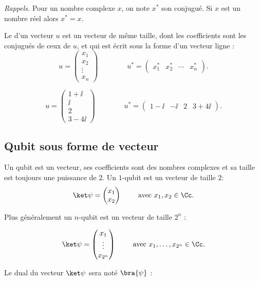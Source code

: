 \documentclass[11pt,class=report,crop=false]{standalone}
\begin{document}
\emph{Rappels.} 
Pour un nombre complexe $x$, on note $x^*$ son conjugué. Si $x$ est un nombre réel alors $x^* = x$.

Le  d'un vecteur $u$ est un vecteur de même taille, dont les coefficients sont les conjugués de ceux de $u$, et qui est écrit sous la forme d'un vecteur ligne :
$$u = \begin{pmatrix}x_1\\x_2\\\vdots\\x_n\end{pmatrix}
\qquad\qquad
u^* = \begin{pmatrix}x_1^*& x_2^*& \cdots &x_n^*\end{pmatrix}.$$


\begin{exemple}
$$u = \begin{pmatrix}1+\ii\\\ii\\2\\3-4\ii\end{pmatrix}
\qquad\qquad
u^* = \begin{pmatrix}1-\ii&-\ii&2&3+4\ii\end{pmatrix}.$$
\end{exemple}

\subsection{Qubit sous forme de vecteur}

Un qubit est un vecteur, ses coefficients sont des nombres complexes et sa taille est toujours
une puissance de $2$.
Un $1$-qubit est un vecteur de taille $2$:
$$\ket\psi = \begin{pmatrix}x_1 \\ x_2 \end{pmatrix}
\qquad \text{ avec } x_1,x_2 \in \Cc.$$

Plus généralement un $n$-qubit est un vecteur de taille $2^n$ :

$$\ket\psi = \begin{pmatrix}x_1 \\ \vdots \\ x_{2^n} \end{pmatrix}
\qquad \text{ avec } x_1,\ldots,x_{2^n} \in \Cc.$$

Le dual du vecteur $\ket\psi$ sera noté $\bra{\psi}$ :
\end{document}
